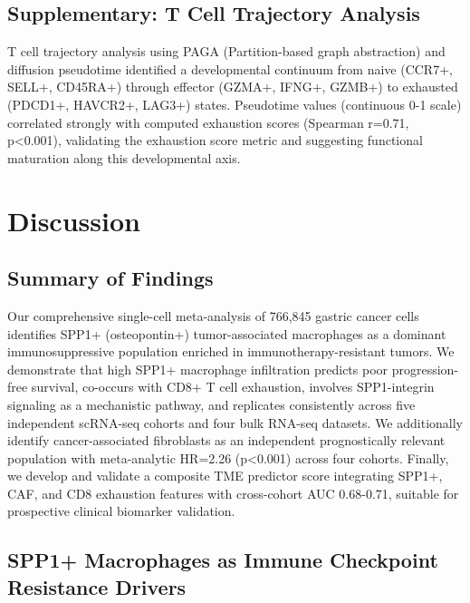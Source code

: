 \documentclass[12pt,twoside]{article}
\begin{document}
\subsection{Supplementary: T Cell Trajectory Analysis}

T cell trajectory analysis using PAGA (Partition-based graph abstraction) and diffusion pseudotime identified a developmental continuum from naive (CCR7+, SELL+, CD45RA+) through effector (GZMA+, IFNG+, GZMB+) to exhausted (PDCD1+, HAVCR2+, LAG3+) states. Pseudotime values (continuous 0-1 scale) correlated strongly with computed exhaustion scores (Spearman r=0.71, p<0.001), validating the exhaustion score metric and suggesting functional maturation along this developmental axis.


\section{Discussion}

\subsection{Summary of Findings}

Our comprehensive single-cell meta-analysis of 766,845 gastric cancer cells identifies SPP1+ (osteopontin+) tumor-associated macrophages as a dominant immunosuppressive population enriched in immunotherapy-resistant tumors. We demonstrate that high SPP1+ macrophage infiltration predicts poor progression-free survival, co-occurs with CD8+ T cell exhaustion, involves SPP1-integrin signaling as a mechanistic pathway, and replicates consistently across five independent scRNA-seq cohorts and four bulk RNA-seq datasets. We additionally identify cancer-associated fibroblasts as an independent prognostically relevant population with meta-analytic HR=2.26 (p<0.001) across four cohorts. Finally, we develop and validate a composite TME predictor score integrating SPP1+, CAF, and CD8 exhaustion features with cross-cohort AUC 0.68-0.71, suitable for prospective clinical biomarker validation.

\subsection{SPP1+ Macrophages as Immune Checkpoint Resistance Drivers}
\end{document}
